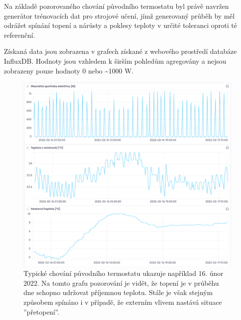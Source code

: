 Na základě pozorovaného chování původního termostatu byl právě navržen generátor trénovacích dat pro strojové učení, jímž generovaný průběh by měl odrážet spínání topení a nárůsty a poklesy teploty v určité toleranci oproti té referenční.

Získaná data jsou zobrazena v grafech získané z webového prostředí databáze InfluxDB. Hodnoty jsou vzhledem k širším pohledům agregovány a nejsou zobrazeny pouze hodnoty 0 nebo \textasciitilde1000 W.

\begin{figure}[hbt]
\centering
\includegraphics[width=\textwidth]{obrazky-figures/test-graph-noml.png}
\caption{Typické chování původního termostatu ukazuje například 16. únor 2022. Na tomto grafu pozorování je vidět, že topení je v průběhu dne schopno udržovat příjemnou teplotu. Stále je však stejným způsobem spínáno i v případě, že externím vlivem nastává situace ''přetopení''.}
\end{figure}

